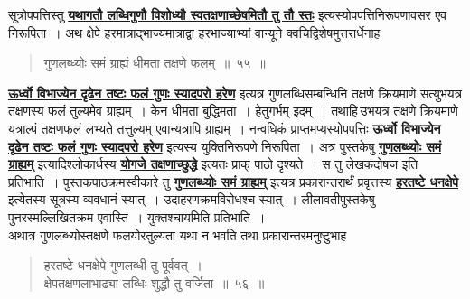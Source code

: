 \documentclass[11pt, openany]{book}
\begin{document}
{{\vspace{-4mm}
 सूत्रोपपत्तिस्तु \hyperref[52]{\textbf{यथागतौ लब्धिगुणौ विशोध्यौ स्वतक्षणाच्छेषमितौ तु तौ स्तः}} इत्यस्योपपत्तिनिरूपणावसर एव निरूपिता~। अथ क्षेपे हरमात्राद्भाज्यमात्राद्वा हरभाज्याभ्यां वान्यूने क्वचिद्विशेषमुत्तरार्धेनाह\textendash

 \label{55}
\begin{quote}
    \ab 
     गुणलब्ध्योः समं ग्राह्यं धीमता तक्षणे फलम्~॥~५५~॥~
\end{quote}
 
 \hyperref[51]{\textbf{ऊर्ध्वो विभाज्येन दृढेन तष्टः फलं गुणः स्यादपरो हरेण}} इत्यत्र 
गुणलब्धिसम्बन्धिनि तक्षणे क्रियमाणे सत्युभयत्र तक्षणस्य फलं तुल्यमेव
\newpage
\noindent ग्राह्यम्~। केन धीमता बुद्धिमता~। हेतुगर्भम् इदम्~। तथाहि\textendash \,उभयत्र तक्षणे क्रियमाणे यत्राल्पं तक्षणफलं लभ्यते तत्तुल्यम् एवान्यत्रापि ग्राह्यम्~। नन्वधिकं प्राप्तमप्यस्योपपत्तिः \hyperref[51]{\textbf{ऊर्ध्वो विभाज्येन दृढेन तष्टः फलं गुणः स्यादपरो हरेण}} इत्यस्य युक्तिनिरूपणे निरूपिता~। अत्र पुस्तकेषु \hyperref[55]{\textbf{गुणलब्ध्योः समं ग्राह्यम्}} इत्यादिश्लोकार्धस्य \hyperref[54]{\textbf{योगजे तक्षणाच्छुद्धे}} इत्यतः प्राक् पाठो दृश्यते~। स तु 
लेखकदोषज इति प्रतिभाति~। पुस्तकपाठक्रमस्वीकारे तु \hyperref[55]{\textbf{गुणलब्ध्योः समं ग्राह्यम्}} इत्यत्र प्रकारान्तरार्थं प्रवृत्तस्य \hyperref[56]{\textbf{हरतष्टे धनक्षेपे}} इत्येतस्य सूत्रस्य 
व्यवधानं स्यात्~। उदाहरणक्रमविरोधश्च स्यात्~। लीलावतीपुस्तकेषु
पुनरस्मल्लिखितक्रम एवास्ति~। युक्तश्चायमिति प्रतिभाति~। \\

\vspace{-4mm}
 अथात्र गुणलब्ध्योस्तक्षणे फलयोरतुल्यता यथा न भवति तथा प्रकारान्तरमनुष्टुभाह\textendash

 \label{56}
\begin{quote}
    \ab 
     हरतष्टे धनक्षेपे गुणलब्धी तु पूर्ववत्~। \\
 क्षेपतक्षणलाभाढ्या लब्धिः शुद्धौ तु वर्जिता~॥~५६~॥~
\end{quote}
 
}}
\end{document}
